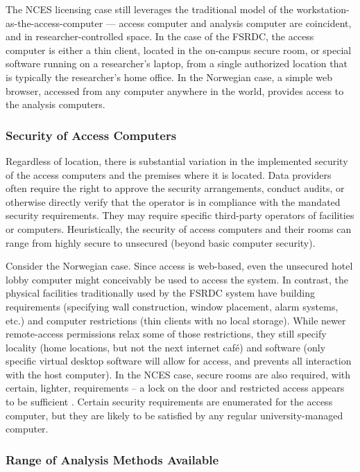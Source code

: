 The NCES licensing case still leverages the traditional model of the workstation-as-the-access-computer --- access computer and analysis computer are coincident, and in researcher-controlled space. In the case of the FSRDC, the access computer is either a thin client, located in the on-campus secure room, or special software running on a researcher's laptop, from a single authorized location that is typically the researcher's home office. In the Norwegian case, a simple web browser, accessed from any computer anywhere in the world, provides access to the analysis computers. 

\subsubsection{Security of Access Computers}

Regardless of location, there is substantial variation in the implemented security of the access computers and the premises where it is located.  Data providers often require the right to approve the security arrangements, conduct audits, or otherwise directly verify that the operator is in compliance with the mandated security requirements. They may require specific third-party operators of facilities or computers. Heuristically, the security of access computers and their rooms can range from highly secure to unsecured (beyond basic computer security).

Consider the Norwegian case. Since access is web-based, even the unsecured hotel lobby computer might conceivably be used to access the system. In contrast, the physical facilities traditionally used by the FSRDC system have building requirements (specifying wall construction, window placement, alarm systems, etc.) and computer restrictions (thin clients with no local storage). While newer remote-access permissions relax some of those restrictions, they still specify locality (home locations, but not the next internet café) and software (only specific virtual desktop software will allow for access, and prevents all interaction with the host computer). In the NCES case, secure rooms are also required, with certain, lighter, requirements -- a lock on the door and restricted access appears to be sufficient \cite{national_center_for_education_statistics_appendix_nodate}. Certain security requirements are enumerated for the access computer, but they are likely to be satisfied by any regular university-managed computer.

\subsubsection{Range of Analysis Methods Available}

